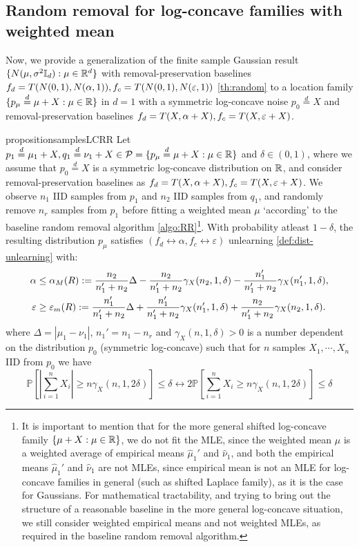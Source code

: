 \subsection{Random removal for log-concave families with weighted mean}
Now, we provide a generalization of the finite sample Gaussian result $\{N(\mu, \sigma^2\mathbb{I}_d): \mu\in \mathbb{R}^d\}$ with removal-preservation baselines $f_d= T(N(0,1), N(\alpha, 1)), f_c=T(N(0,1), N(\varepsilon,1))$ \ref{th:random} to a location family $\{p_{\mu} \overset{d}{=} \mu+X: \mu \in \mathbb{R}\}$ in $d=1$ with a symmetric log-concave noise $p_0 \overset{d}{=}X$ and removal-preservation baselines $f_d= T(X, \alpha+X), f_c=T(X,\varepsilon+X)$.
\begin{restatable}{proposition}{samplesLCRR}
\label{th:randomLC}
Let $p_1\overset{d}{=}\mu_1+X, q_1\overset{d}{=} \nu_1+ X \in \mathcal{P}= \{p_{\mu} \overset{d}{=} \mu+X: \mu \in \mathbb{R}\}$ and $\delta \in (0,1)$, where we assume that $p_0\overset{d}{=}X$ is a symmetric log-concave distribution on $\mathbb{R}$, and consider removal-preservation baselines as $f_d= T(X, \alpha+X), f_c=T(X,\varepsilon+X)$. We observe $n_1$ IID samples from $p_1$ and $n_2$ IID samples from $q_1$, and randomly remove $n_r$ samples from $p_1$ before fitting a weighted mean $\mu$ `according' to the baseline random removal algorithm \ref{algo:RR}\footnote{It is important to mention that for the more general shifted log-concave family $\{\mu+X:\mu\in \mathbb{R}\}$, we do not fit the MLE, since the weighted mean $\mu$ is a weighted average of empirical means $\hat{\mu}_1'$ and $\hat{\nu}_1$, and both the empirical means  $\hat{\mu}_1'$ and $\hat{\nu}_1$ are not MLEs, since empirical mean is not an MLE for log-concave families in general (such as shifted Laplace family), as it is the case for Gaussians. For mathematical tractability, and trying to bring out the structure of a reasonable baseline  in the more general log-concave situation, we still consider weighted empirical  means and not weighted MLEs, as required in the baseline random removal algorithm.}. With probability atleast $1 - \delta$, the resulting  distribution $p_{\mu}$ satisfies $(f_d \leftrightarrow \alpha,f_c\leftrightarrow  \varepsilon)$ unlearning \ref{def:dist-unlearning} with:
\begin{align*}
\alpha & \leq \alpha_M(R):=\frac{n_2}{n_1' + n_2} \Delta - \frac{n_2}{n_1' + n_2} \gamma_X(n_2, 1,\delta) -\frac{n_1'}{n_1' + n_2} \gamma_X(n_1',1,\delta) , \\
\varepsilon &\geq  \varepsilon_m(R):= \frac{n_1'}{n_1' + n_2}  \Delta + \frac{n_1'}{n_1' + n_2}  \gamma_X(n_1',1,\delta) + \frac{n_2}{n_1' + n_2}  \gamma_X(n_2, 1,\delta).
\end{align*}
where $\Delta = |\mu_1- \nu_1|$, $n_1'= n_1- n_r$ and $\gamma_X(n, 1, \delta)>0$ is a number dependent on the distribution $p_0$ (symmetric log-concave) such that for $n$ samples $X_1, \cdots, X_n$   IID from $p_0$ we have 
\begin{equation}
    \mathbb{P}\left[|\sum_{i=1}^n X_i| \geq n \gamma_X(n,1, 2\delta)\right] \leq \delta \leftrightarrow  2 \mathbb{P}\left[\sum_{i=1}^n X_i \geq n \gamma_X(n,1, 2\delta)\right] \leq \delta
\end{equation}
\end{restatable}

